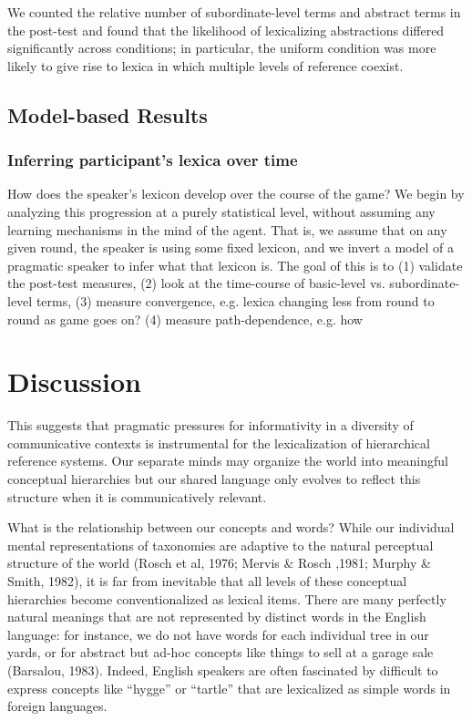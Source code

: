 \documentclass[10pt,letterpaper]{article}
\begin{document}
We counted the relative number of subordinate-level terms and abstract terms in the post-test and found that the likelihood of lexicalizing abstractions differed significantly across conditions; in particular, the uniform condition was more likely to give rise to lexica in which multiple levels of reference coexist. 

\subsection{Model-based Results}

\subsubsection{Inferring participant's lexica over time}

How does the speaker's lexicon develop over the course of the game? We begin by analyzing this progression at a purely statistical level, without assuming any learning mechanisms in the mind of the agent. That is, we assume that on any given round, the speaker is using some fixed lexicon, and we invert a model of a pragmatic speaker to infer what that lexicon is. The goal of this is to (1) validate the post-test measures, (2) look at the time-course of basic-level vs. subordinate-level terms, (3) measure convergence, e.g. lexica changing less from round to round as game goes on? (4) measure path-dependence, e.g. how 

\section{Discussion}

This suggests that pragmatic pressures for informativity in a diversity of communicative contexts is instrumental for the lexicalization of hierarchical reference systems. Our separate minds may organize the world into meaningful conceptual hierarchies but our shared language only evolves to reflect this structure when it is communicatively relevant. 

What is the relationship between our concepts and words? While our individual mental representations of taxonomies are adaptive to the natural perceptual structure of the world (Rosch et al, 1976; Mervis \& Rosch ,1981; Murphy \& Smith, 1982), it is far from inevitable that all levels of these conceptual hierarchies become conventionalized as lexical items. There are many perfectly natural meanings that are not represented by distinct words in the English language: for instance, we do not have words for each individual tree in our yards, or for abstract but ad-hoc concepts like things to sell at a garage sale (Barsalou, 1983). Indeed, English speakers are often fascinated by difficult to express concepts like ``hygge'' or ``tartle'' that are lexicalized as simple words in foreign languages.
\end{document}
